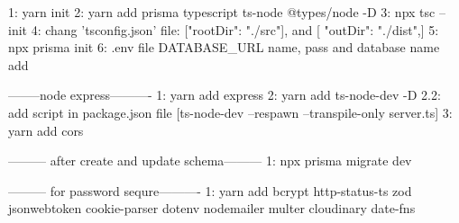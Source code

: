 1: yarn init
2: yarn add prisma typescript ts-node @types/node -D
3: npx tsc --init
4: chang 'tsconfig.json' file: ["rootDir": "./src"],   and [ "outDir": "./dist",]
5: npx prisma init
6: .env file DATABASE_URL name, pass and database name add



--------node express----------
1: yarn add express
2: yarn add ts-node-dev -D
2.2: add script in package.json file [ts-node-dev --respawn --transpile-only server.ts]
3: yarn add cors

--------- after create and update schema---------
1: npx prisma migrate dev


--------- for password sequre----------
1: yarn add bcrypt http-status-ts zod jsonwebtoken cookie-parser dotenv nodemailer multer cloudinary date-fns
